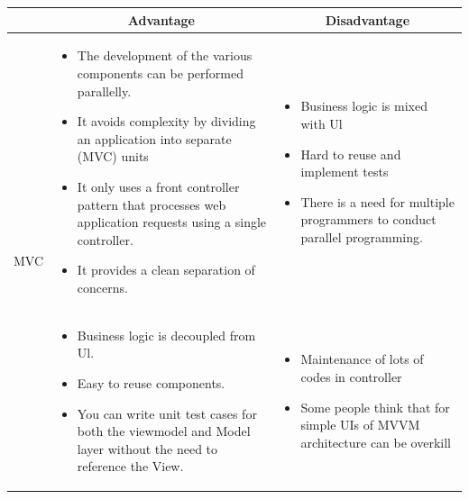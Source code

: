 \begin{table}[H]
    \centering
    \begin{tabular}{| c | p{} | p{} |}
        \hline
        \multicolumn{1}{|c|}{}
        & \multicolumn{1}{c|}{Advantage}
        & \multicolumn{1}{c|}{Disadvantage} \\ \hline
        \multirow{4}{*}{MVC}     
                &   \begin{itemize}[leftmargin=*,topsep=0pt,partopsep=0pt,parsep=0pt]
                        \item The development of the various components can be performed parallelly.
                        \item It avoids complexity by dividing an application into separate (MVC) units
                        \item It only uses a front controller pattern that processes web application requests using a single controller.
                        \item It provides a clean separation of concerns.
                    \end{itemize}
                &   \begin{itemize}[leftmargin=*,topsep=0pt,partopsep=0pt,parsep=0pt]
                        \item Business logic is mixed with Ul
                        \item Hard to reuse and implement tests
                        \item There is a need for multiple programmers to conduct parallel programming.
                    \end{itemize} \\ \hline
        \multirow{4}{*}{MVVC}
                &   \begin{itemize}[leftmargin=*,topsep=0pt,partopsep=0pt,parsep=0pt]
                        \item Business logic is decoupled from Ul.
                        \item Easy to reuse components.
                        \item You can write unit test cases for both the viewmodel and Model layer without the need to reference the View.
                    \end{itemize}
                &   \begin{itemize}[leftmargin=*,topsep=0pt,partopsep=0pt,parsep=0pt]
                        \item Maintenance of lots of codes in controller
                        \item Some people think that for simple UIs of MVVM architecture can be overkill
                    \end{itemize} \\ \hline
    \end{tabular}
\end{table}

